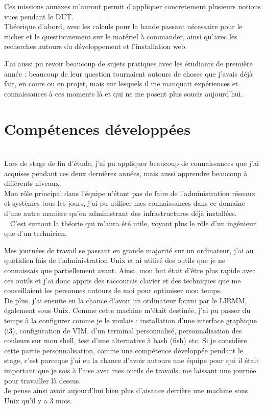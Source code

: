 \documentclass[11pt,french,a4paper]{report}
\begin{document}
Ces missions annexes m'auront permit d'appliquer concretement plusieurs notions vues pendant le DUT. \\
Théorique d'abord, avec les calculs pour la bande passant nécessaire pour le rucher et le questionnement sur le matériel à commander, ainsi
qu'avec les recherches autours du développement et l'installation web. 

J'ai aussi pu revoir beaucoup de sujets pratiques avec les étudiants de première année : beaucoup de leur question tournaient autours 
de choses que j'avais déjà fait, en cours ou en projet,  mais sur lesquels il me manquait expériences et connaissances à ces moments là et
qui ne me posent plus soucis aujourd'hui. \\


    \section{Compétences développées} \\

Lors de stage de fin d'étude, j'ai pu appliquer beaucoup de connaissances que j'ai acquises pendant ces deux dernières années,
mais aussi apprendre beaucoup à différents niveaux.\\

Mon rôle principal dans l'équipe n'étant pas de faire de l'administration réseaux et systèmes tous les jours, 
j'ai pu utiliser mes connaissances dans ce domaine d'une autre manière qu'en administrant des infrastructures déjà installées. \\ 
C'est surtout la théorie qui m'aura été utile, voyant plus le rôle d'un ingénieur que d'un technicien. 

Mes journées de travail se passant en grande majorité sur un ordinateur, j'ai au quotidien fais de l'administration Unix et ai
utilisé des outils que je ne connaissais que partiellement avant. Ainsi, mon but était d'être plus rapide avec ces outils 
et j'ai donc appris des raccourcis clavier et des techniques que me conseillaient les personnes autours de moi pour optimiser 
mon temps. \\

De plus, j'ai ensuite eu la chance d'avoir un ordinateur fourni par le LIRMM, également sous Unix.
Comme cette machine m'était destinée, j'ai pu passer du temps à la configurer comme je le voulais : 
installation d'une interface graphique (i3), configuration de VIM, d'un terminal personnalisé, personnalisation des couleurs 
sur mon shell, test d'une alternative à bash (fish) etc. 
Si je considère cette partie personnalisation, comme une compétence développée pendant le stage, c'est parceque j'ai eu la chance 
d'avoir autours une équipe pour qui il était important que je sois à l'aise avec mes outils de travails, me laissant une 
journée pour travailler là dessus. \\
Je pense ainsi avoir aujourd'hui bien plus d'aisance derrière une machine sous Unix qu'il y a 3 mois. \\
\end{document}

